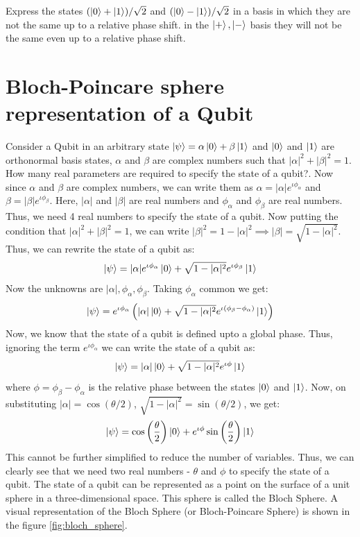\begin{example}
    Express the states $(\ket{0}+\ket{1})/\sqrt{2}$ and $(\ket{0}-\ket{1})/\sqrt{2}$ in a basis in which they are not the same up to a relative phase shift.
    in the $\ket{+}, \ket{-}$ basis they will not be the same even up to a relative phase shift. 
\end{example}





\section{Bloch-Poincare sphere representation of a Qubit}
Consider a Qubit in an arbitrary state $\ket{\psi}=\alpha\ket{0}+\beta\ket{1}$ and $\ket{0}$ and $\ket{1}$ are orthonormal basis states, $\alpha$ and $\beta$ are complex numbers such that $|\alpha|^2+|\beta|^2=1$.
How many real parameters are required to specify the state of a qubit?. Now since $\alpha$ and $\beta$ are complex numbers, we can write them as $\alpha=|\alpha|e^{\iota \phi_{\alpha}}$
and $\beta = |\beta| e^{\iota \phi_{\beta}}$. Here, $|\alpha|$ and $|\beta|$ are real numbers and $\phi_{\alpha}$ and $\phi_{\beta}$ are real numbers. Thus, we need 4 real numbers to specify the state of a qubit.
Now putting the condition that $|\alpha|^2+|\beta|^2=1$, we can write $|\beta|^2=1-|\alpha|^2 \implies |\beta|=\sqrt{1-|\alpha|^2}$.
Thus, we can rewrite the state of a qubit as:
\[ 
    \ket{\psi}=|\alpha|e^{\iota \phi_{\alpha}}\ket{0}+\sqrt{1-|\alpha|^2}e^{\iota \phi_{\beta}}\ket{1}
\]
Now the unknowns are $|\alpha|,\phi_{\alpha},\phi_{\beta}$. Taking $\phi_{\alpha}$ common we get:
\[
    \ket{\psi}=e^{\iota \phi_{\alpha}}\left(|\alpha|\ket{0}+\sqrt{1-|\alpha|^2}e^{\iota(\phi_{\beta}-\phi_{\alpha})}\ket{1}\right)
\]
Now, we know that the state of a qubit is defined upto a global phase. Thus, ignoring the term
$e^{\iota \phi_{\alpha}}$ we can write the state of a qubit as:
\[
    \ket{\psi}=|\alpha|\ket{0}+\sqrt{1-|\alpha|^2}e^{\iota \phi}\ket{1}
\]
where $\phi=\phi_{\beta}-\phi_{\alpha}$ is the relative phase between the states $\ket{0}$ and $\ket{1}$. 
Now, on substituting $|\alpha|=\cos(\theta/2)$, $\sqrt{1-|\alpha|^2}=\sin(\theta/2)$, we get:
\[
    \ket{\psi}=\cos\left(\frac{\theta}{2}\right)\ket{0}+e^{\iota \phi}\sin\left(\frac{\theta}{2}\right)\ket{1}
\]
This cannot be further simplified to reduce the number of variables. Thus, we can clearly see that we need two real numbers - $\theta$ and $\phi$ to specify the state of a qubit.
The state of a qubit can be represented as a point on the surface of a unit sphere in a three-dimensional space. This sphere is called the Bloch Sphere.
A visual representation of the Bloch Sphere (or Bloch-Poincare Sphere) is shown in the figure \ref{fig:bloch_sphere}.

